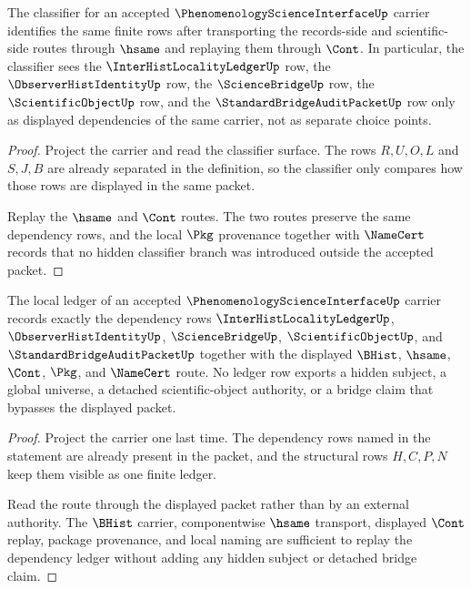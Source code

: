 \begin{theorem}
\label{thm:phenomenology-science-interface-obligation-classifier}
The classifier for an accepted $\PhenomenologyScienceInterfaceUp$ carrier identifies the same finite rows after transporting the records-side and scientific-side routes through $\hsame$ and replaying them through $\Cont$. In particular, the classifier sees the $\InterHistLocalityLedgerUp$ row, the $\ObserverHistIdentityUp$ row, the $\ScienceBridgeUp$ row, the $\ScientificObjectUp$ row, and the $\StandardBridgeAuditPacketUp$ row only as displayed dependencies of the same carrier, not as separate choice points.
\end{theorem}
\begin{proof}
Project the carrier and read the classifier surface. The rows $R,U,O,L$ and $S,J,B$ are already separated in the definition, so the classifier only compares how those rows are displayed in the same packet.

Replay the $\hsame$ and $\Cont$ routes. The two routes preserve the same dependency rows, and the local $\Pkg$ provenance together with $\NameCert$ records that no hidden classifier branch was introduced outside the accepted packet.
\end{proof}

\begin{theorem}
\label{thm:phenomenology-science-interface-obligation-ledger}
The local ledger of an accepted $\PhenomenologyScienceInterfaceUp$ carrier records exactly the dependency rows $\InterHistLocalityLedgerUp$, $\ObserverHistIdentityUp$, $\ScienceBridgeUp$, $\ScientificObjectUp$, and $\StandardBridgeAuditPacketUp$ together with the displayed $\BHist$, $\hsame$, $\Cont$, $\Pkg$, and $\NameCert$ route. No ledger row exports a hidden subject, a global universe, a detached scientific-object authority, or a bridge claim that bypasses the displayed packet.
\end{theorem}
\begin{proof}
Project the carrier one last time. The dependency rows named in the statement are already present in the packet, and the structural rows $H,C,P,N$ keep them visible as one finite ledger.

Read the route through the displayed packet rather than by an external authority. The $\BHist$ carrier, componentwise $\hsame$ transport, displayed $\Cont$ replay, package provenance, and local naming are sufficient to replay the dependency ledger without adding any hidden subject or detached bridge claim.
\end{proof}

